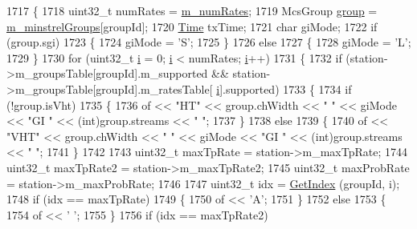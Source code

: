 \begin{DoxyCode}
1717 \{
1718   uint32\_t numRates = \hyperlink{classns3_1_1MinstrelHtWifiManager_a2f3d0e7f6c298a40dbc8699805103142}{m\_numRates};
1719   McsGroup \hyperlink{namespacevisualizer_1_1higcontainer_aa6ad2b76790275bfce7783429beaa23f}{group} = \hyperlink{classns3_1_1MinstrelHtWifiManager_a231741ce3f38417925019aa598570468}{m\_minstrelGroups}[groupId];
1720   \hyperlink{namespacens3_1_1TracedValueCallback_a7ffd3e7c142ffe7c8a1d2db9b8de38ec}{Time} txTime;
1721   \textcolor{keywordtype}{char} giMode;
1722   \textcolor{keywordflow}{if} (group.sgi)
1723     \{
1724       giMode = \textcolor{charliteral}{'S'};
1725     \}
1726   \textcolor{keywordflow}{else}
1727     \{
1728       giMode = \textcolor{charliteral}{'L'};
1729     \}
1730   \textcolor{keywordflow}{for} (uint32\_t \hyperlink{bernuolliDistribution_8m_a6f6ccfcf58b31cb6412107d9d5281426}{i} = 0; \hyperlink{bernuolliDistribution_8m_a6f6ccfcf58b31cb6412107d9d5281426}{i} < numRates; \hyperlink{bernuolliDistribution_8m_a6f6ccfcf58b31cb6412107d9d5281426}{i}++)
1731     \{
1732       \textcolor{keywordflow}{if} (station->m\_groupsTable[groupId].m\_supported && station->m\_groupsTable[groupId].m\_ratesTable[
      \hyperlink{bernuolliDistribution_8m_a6f6ccfcf58b31cb6412107d9d5281426}{i}].supported)
1733         \{
1734           \textcolor{keywordflow}{if} (!group.isVht)
1735             \{
1736               of << \textcolor{stringliteral}{"HT"} << group.chWidth << \textcolor{stringliteral}{"   "} << giMode << \textcolor{stringliteral}{"GI  "} << (int)group.streams << \textcolor{stringliteral}{"   "};
1737             \}
1738           \textcolor{keywordflow}{else}
1739             \{
1740               of << \textcolor{stringliteral}{"VHT"} << group.chWidth << \textcolor{stringliteral}{"   "} << giMode << \textcolor{stringliteral}{"GI  "} << (int)group.streams << \textcolor{stringliteral}{"   "};
1741             \}
1742 
1743           uint32\_t maxTpRate = station->m\_maxTpRate;
1744           uint32\_t maxTpRate2 = station->m\_maxTpRate2;
1745           uint32\_t maxProbRate = station->m\_maxProbRate;
1746 
1747           uint32\_t idx = \hyperlink{classns3_1_1MinstrelHtWifiManager_ac67b182c22710c919c3dd4de337aca79}{GetIndex} (groupId, i);
1748           \textcolor{keywordflow}{if} (idx == maxTpRate)
1749             \{
1750               of << \textcolor{charliteral}{'A'};
1751             \}
1752           \textcolor{keywordflow}{else}
1753             \{
1754               of << \textcolor{charliteral}{' '};
1755             \}
1756           \textcolor{keywordflow}{if} (idx == maxTpRate2)

\end{DoxyCode}
